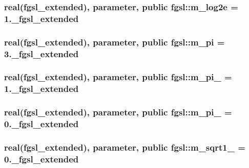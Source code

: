\hypertarget{classfgsl_a93d2e5a473874e31cbcf8de12963fd8e}{
\subsubsection[{m\-\_\-log2e}]{\setlength{\rightskip}{0pt plus 5cm}real({\bf fgsl\-\_\-extended}), parameter, public fgsl\-::m\-\_\-log2e = 1.\-\_\-fgsl\-\_\-extended}}\label{classfgsl_a93d2e5a473874e31cbcf8de12963fd8e}
\hypertarget{classfgsl_a8af1e390793c77a120b600e4844495dc}{
\subsubsection[{m\-\_\-pi}]{\setlength{\rightskip}{0pt plus 5cm}real({\bf fgsl\-\_\-extended}), parameter, public fgsl\-::m\-\_\-pi = 3.\-\_\-fgsl\-\_\-extended}}\label{classfgsl_a8af1e390793c77a120b600e4844495dc}
\hypertarget{classfgsl_af8cd74655823aa30933d33b51ac35bbc}{
\subsubsection[{m\-\_\-pi\-\_\-2}]{\setlength{\rightskip}{0pt plus 5cm}real({\bf fgsl\-\_\-extended}), parameter, public fgsl\-::m\-\_\-pi\-\_ = 1.\-\_\-fgsl\-\_\-extended}}\label{classfgsl_af8cd74655823aa30933d33b51ac35bbc}
\hypertarget{classfgsl_ac72cdbd05abd60541bd253d571673cf4}{
\subsubsection[{m\-\_\-pi\-\_\-4}]{\setlength{\rightskip}{0pt plus 5cm}real({\bf fgsl\-\_\-extended}), parameter, public fgsl\-::m\-\_\-pi\-\_ = 0.\-\_\-fgsl\-\_\-extended}}\label{classfgsl_ac72cdbd05abd60541bd253d571673cf4}
\hypertarget{classfgsl_aa15c7774ec8561b9221b81138e50d715}{
\subsubsection[{m\-\_\-sqrt1\-\_\-2}]{\setlength{\rightskip}{0pt plus 5cm}real({\bf fgsl\-\_\-extended}), parameter, public fgsl\-::m\-\_\-sqrt1\-\_ = 0.\-\_\-fgsl\-\_\-extended}}\label{classfgsl_aa15c7774ec8561b9221b81138e50d715}
